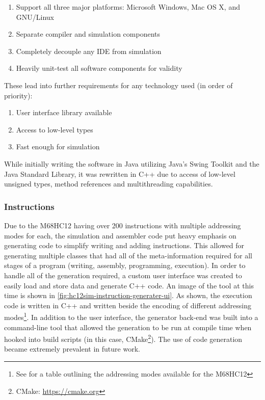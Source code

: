 \begin{enumerate}
    \item Support all three major platforms: Microsoft Windows, Mac OS X, and GNU/Linux
    \item Separate compiler and simulation components
    \item Completely decouple any IDE from simulation
    \item Heavily unit-test all software components for validity
\end{enumerate}

These lead into further requirements for any technology used (in order of priority): 

\begin{enumerate}
    \item User interface library available
    \item Access to low-level types
    \item Fast enough for simulation
\end{enumerate}

While initially writing the software in Java utilizing Java's Swing Toolkit and the Java Standard Library, it was rewritten in C++ due to access of low-level unsigned types, method references and multithreading capabilities.

\subsubsection*{Instructions}
\label{sec:hc12sim:instruction-generation}

Due to the M68HC12 having over 200 instructions with multiple addressing modes for each\cite{hc12Manual2006}, the simulation and assembler code put heavy emphasis on generating code to simplify writing and adding instructions. This allowed for generating multiple classes that had all of the meta-information required for all stages of a program (writing, assembly, programming, execution). In order to handle all of the generation required, a custom user interface was created to easily load and store data and generate C++ code. An image of the tool at this time is shown in \cref{fig:hc12sim-instruction-generater-ui}. As shown, the execution code is written in C++ and written beside the encoding of different addressing modes\footnote{See \cite[Table~3-1,~p.~30]{hc12Manual2006} for a table outlining the addressing modes available for the M68HC12}. In addition to the user interface, the generator back-end was built into a command-line tool that allowed the generation to be run at compile time when hooked into build scripts (in this case, CMake\footnote{CMake: \url{https://cmake.org}}). The use of code generation became extremely prevalent in future work. 

